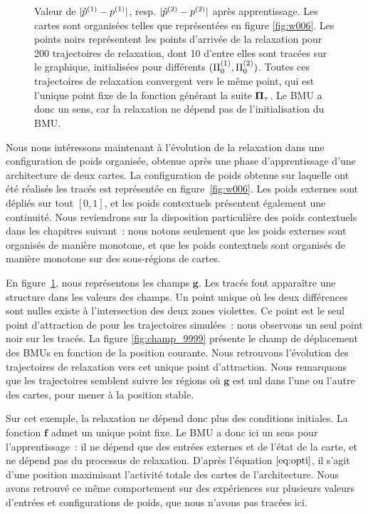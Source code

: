 \documentclass[../main]{subfiles}
\begin{document}
\begin{figure}
\begin{minipage}{0.5\textwidth}
	\end{minipage}
	\caption{Valeur de $\lvert{\hat{p}}^{({1})} - p^{({1})}\rvert$, resp. $\lvert{\hat{p}}^{({2})} - p^{({2})}\rvert$ après apprentissage. Les cartes sont organisées telles que représentées en figure \ref{fig:w006}. 
	Les points noirs représentent les points d'arrivée de la relaxation pour 200 trajectoires de relaxation, dont 10 d'entre elles sont tracées sur le graphique, initialisées pour différents $(\Pi_0^{({1})}, \Pi_0^{({2})})$. Toutes ces trajectoires de relaxation convergent vers le même point, qui est l'unique point fixe de la fonction générant la suite $\mathbf{\Pi}_\tau$. Le BMU a donc un sens, car la relaxation ne dépend pas de l'initialisation du BMU.
	\label{fig:diff_relax_notraj}}
	\end{figure}

Nous nous intéressons maintenant à l'évolution de la relaxation dans une configuration de poids organisée, obtenue après une phase d'apprentissage d'une architecture de deux cartes.
La configuration de poids obtenue sur laquelle ont été réalisés les tracés est représentée en figure~\ref{fig:w006}. 
Les poids externes sont dépliés sur tout $[0,1]$, et les poids contextuels présentent également une continuité. Nous reviendrons sur la disposition particulière des poids contextuels dans les chapitres suivant~: nous notons seulement que les poids externes sont organisés de manière monotone, et que les poids contextuels sont organisés de manière monotone sur des sous-régions de cartes.

En figure~\ref{fig:diff_relax_notraj}, nous représentons les champs $\mathbf{g}$. 
Les tracés font apparaître une structure dans les valeurs des champs.
Un point unique où les deux différences sont nulles existe à l'intersection des deux zones violettes. Ce point est le seul point d'attraction de pour les trajectoires simulées~: nous observons un seul point noir sur les tracés.
La figure \ref{fig:champ_9999} présente le champ de déplacement des BMUs en fonction de la position courante. 
Nous retrouvons l'évolution des trajectoires de relaxation vers cet unique point d'attraction. Nous remarquons que les trajectoires semblent suivre les régions où $\mathbf{g}$ est nul dans l'une ou l'autre des cartes, pour mener à la position stable. 

Sur cet exemple, la relaxation ne dépend donc plus des conditions initiales. La fonction $\mathbf{f}$ admet un unique point fixe. 
Le BMU a donc ici un sens pour l'apprentissage~: il ne dépend que des entrées externes et de l'état de la carte, et ne dépend pas du processus de relaxation. D'après l'équation $\ref{eq:opti}$, il s'agit d'une position maximisant l'activité totale des cartes de l'architecture.
Nous avons retrouvé ce même comportement sur des expériences sur plusieurs valeurs d'entrées et configurations de poids, que nous n'avons pas tracées ici.
\end{document}
